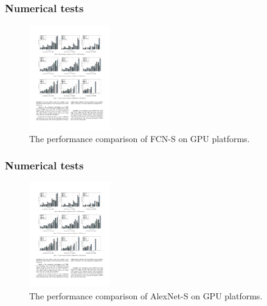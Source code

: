%

\begin{frame}
	\MyLogo
	\frametitle{Numerical tests}  
	\begin{figure}[htbp] 
		\includegraphics[height=1.8in]{figures/FCN-S2.pdf} 
		\caption{The performance comparison of FCN-S on GPU platforms.}
	\end{figure}
\end{frame}

%

\begin{frame}
	\MyLogo
	\frametitle{Numerical tests}  
	\begin{figure}[htbp] 
		\includegraphics[height=1.8in]{figures/AlexNet-S2.pdf} 
		\caption{The performance comparison of AlexNet-S on GPU platforms.}
	\end{figure}
\end{frame}